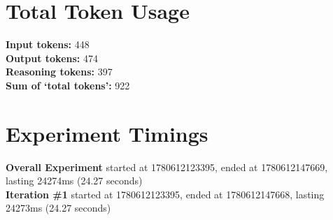 \documentclass{article}
\begin{document}
\section*{Total Token Usage}
\textbf{Input tokens: }448
\\\textbf{Output tokens: }474
\\\textbf{Reasoning tokens: }397
\\\textbf{Sum of `total tokens': }922
\section*{Experiment Timings}
\textbf{Overall Experiment} started at 1780612123395, ended at 1780612147669, lasting 24274ms (24.27 seconds)
\\\textbf{Iteration \#1} started at 1780612123395, ended at 1780612147668, lasting 24273ms (24.27 seconds)
\end{document}
